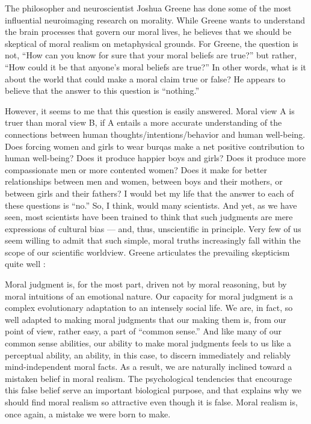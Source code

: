 \documentclass[a4paper,14pt]{extbook}
\begin{document}
The philosopher and neuroscientist Joshua Greene has done some of the most influential neuroimaging research on morality.
While Greene wants to understand the brain processes that govern our moral lives, he believes that we should be skeptical of moral realism on metaphysical grounds.
For Greene, the question is not, ``How can you know for sure that your moral beliefs are true?'' but rather, ``How could it be that anyone's moral beliefs are true?''
In other words, what is it about the world that could make a moral claim true or false?
He appears to believe that the answer to this question is ``nothing.''

However, it seems to me that this question is easily answered.
Moral view A is truer than moral view B, if A entails a more accurate understanding of the connections between human thoughts/intentions/behavior and human well-being.
Does forcing women and girls to wear burqas make a net positive contribution to human well-being?
Does it produce happier boys and girls?
Does it produce more compassionate men or more contented women?
Does it make for better relationships between men and women, between boys and their mothers, or between girls and their fathers?
I would bet my life that the answer to each of these questions is ``no.''
So, I think, would many scientists.
And yet, as we have seen, most scientists have been trained to think that such judgments are mere expressions of cultural bias --- and, thus, unscientific in principle.
Very few of us seem willing to admit that such simple, moral truths increasingly fall within the scope of our scientific worldview.
Greene articulates the prevailing skepticism quite well :

Moral judgment is, for the most part, driven not by moral reasoning, but by moral intuitions of an emotional nature.
Our capacity for moral judgment is a complex evolutionary adaptation to an intensely social life.
We are, in fact, so well adapted to making moral judgments that our making them is, from our point of view, rather easy, a part of ``common sense.''
And like many of our common sense abilities, our ability to make moral judgments feels to us like a perceptual ability, an ability, in this case, to discern immediately and reliably mind-independent moral facts.
As a result, we are naturally inclined toward a mistaken belief in moral realism.
The psychological tendencies that encourage this false belief serve an important biological purpose, and that explains why we should find moral realism so attractive even though it is false.
Moral realism is, once again, a mistake we were born to make.
\end{document}
